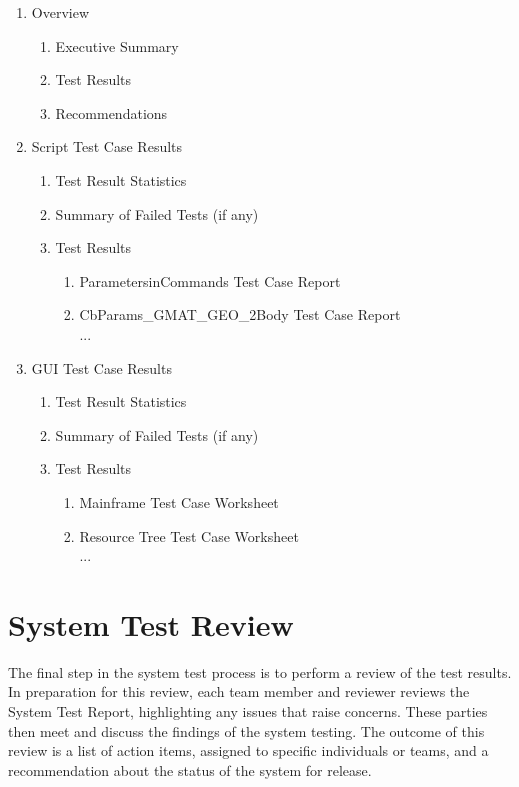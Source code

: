 \renewcommand\theenumi   {\Roman{enumi}}
\renewcommand\theenumii  {\Alph{enumii}}
\renewcommand\labelenumii{\theenumii.}
\begin{enumerate}
\item Overview
\begin{enumerate}
\item Executive Summary
\item Test Results
\item Recommendations
\end{enumerate}
\item Script Test Case Results
\begin{enumerate}
\item Test Result Statistics
\item Summary of Failed Tests (if any)
\item Test Results
\begin{enumerate}
\item ParametersinCommands Test Case Report
\item CbParams\_GMAT\_GEO\_2Body Test Case Report\\
...
\end{enumerate}
\end{enumerate}
\item GUI Test Case Results
\begin{enumerate}
\item Test Result Statistics
\item Summary of Failed Tests (if any)
\item Test Results
\begin{enumerate}
\item Mainframe Test Case Worksheet
\item Resource Tree Test Case Worksheet\\
...
\end{enumerate}
\end{enumerate}
\end{enumerate}

\section{\label{section:TestReview}System Test Review}

The final step in the system test process is to perform a review of the test results.  In preparation for this review, each team member and reviewer reviews the System Test Report, highlighting any issues that raise concerns.  These parties then meet and discuss the findings of the system testing.  The outcome of this review is a list of action items, assigned to specific individuals or teams, and a recommendation about the status of the system for release.

